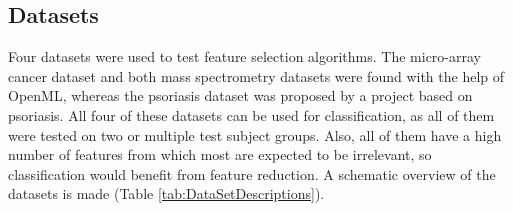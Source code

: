 	\subsection{Datasets}
	\label{subsec:Datasets}
	
	Four datasets were used to test feature selection algorithms. The micro-array cancer dataset and both mass spectrometry datasets were found with the help of OpenML\cite{OpenML2013}, whereas the psoriasis dataset was proposed by a project based on psoriasis\cite{felix2017dynamic}. All four of these datasets can be used for classification, as all of them were tested on two or multiple test subject groups. Also, all of them have a high number of features from which most are expected to be irrelevant, so classification would benefit from feature reduction. A schematic overview of the datasets is made (Table \ref{tab:DataSetDescriptions}).
	

